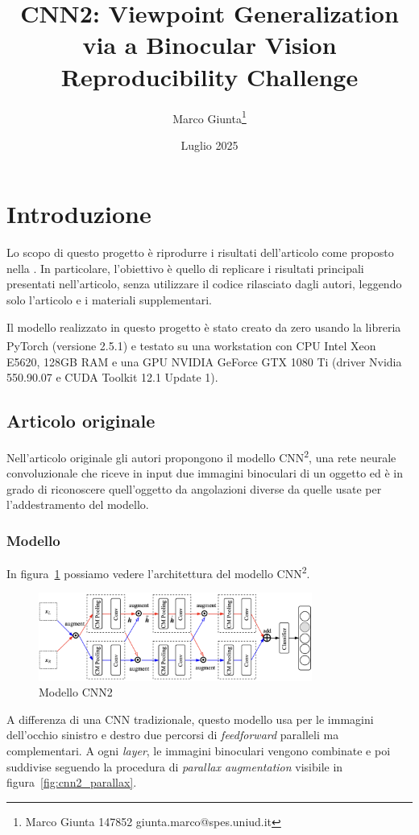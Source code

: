 \documentclass[italian,12pt,a4paper,oneside,final]{report}
\title{\Large CNN2: Viewpoint Generalization via a Binocular Vision\\[0.5em]
\large Reproducibility Challenge}
\date{Luglio 2025}
\author{
Marco Giunta\thanks{Marco Giunta 147852 giunta.marco@spes.uniud.it}}
\begin{document}
\maketitle

\tableofcontents

\newpage
\section{Introduzione}

Lo scopo di questo progetto è riprodurre i risultati dell'articolo \cite{neurips2019:cnn2} come proposto nella \cite{neurips2019:reproducibility-challenge}.
In particolare, l'obiettivo è quello di replicare i risultati principali presentati nell'articolo, senza utilizzare il codice rilasciato dagli autori, leggendo solo l'articolo e i materiali supplementari.

Il modello realizzato in questo progetto è stato creato da zero usando la libreria PyTorch (versione 2.5.1) e testato su una workstation con CPU Intel\textsuperscript{\tiny{\textregistered}} Xeon\textsuperscript{\tiny{\textregistered}} E5620, 128GB RAM e una GPU NVIDIA GeForce GTX 1080 Ti (driver Nvidia 550.90.07 e CUDA Toolkit 12.1 Update 1).

\subsection{Articolo originale}
Nell'articolo originale gli autori propongono il modello CNN\textsuperscript{2}, una rete neurale convoluzionale che riceve in input due immagini binoculari di un oggetto ed è in grado di riconoscere quell'oggetto da angolazioni diverse da quelle usate per l'addestramento del modello.

\subsubsection{Modello}
In figura~\ref{fig:cnn2_model} possiamo vedere l'architettura del modello CNN\textsuperscript{2}.
\begin{figure}[ht]
	\centering
	\includegraphics[width=0.8\textwidth]{model-cnn2.png}
	\caption{Modello CNN2}
	\label{fig:cnn2_model}
\end{figure}
A differenza di una CNN tradizionale, questo modello usa per le immagini dell'occhio sinistro e destro due percorsi di \textit{feedforward} paralleli ma complementari.
A ogni \textit{layer}, le immagini binoculari vengono combinate e poi suddivise seguendo la procedura di \textit{parallax augmentation} visibile in figura~\ref{fig:cnn2_parallax}.
\end{document}
